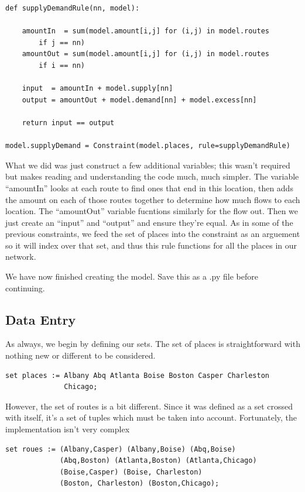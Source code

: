 \documentclass{article}
\begin{document}
\begin{verbatim}
def supplyDemandRule(nn, model):
    
    amountIn  = sum(model.amount[i,j] for (i,j) in model.routes 
        if j == nn)
    amountOut = sum(model.amount[i,j] for (i,j) in model.routes 
        if i == nn)
    
    input  = amountIn + model.supply[nn]
    output = amountOut + model.demand[nn] + model.excess[nn]
    
    return input == output

model.supplyDemand = Constraint(model.places, rule=supplyDemandRule)
\end{verbatim}

What we did was just construct a few additional variables; this wasn't required but makes reading and understanding the code much, much simpler.  The variable ``amountIn'' looks at each route to find ones that end in this location, then adds the amount on each of those routes together to determine how much flows to each location.  The ``amountOut'' variable fucntions similarly for the flow out.  Then we just create an ``input'' and ``output'' and ensure they're equal.  As in some of the previous constraints, we feed the set of places into the constraint as an arguement so it will index over that set, and thus this rule functions for all the places in our network.

We have now finished creating the model.  Save this as a .py file before continuing.

\subsection*{Data Entry}

As always, we begin by defining our sets.  The set of places is straightforward with nothing new or different to be considered.

\begin{verbatim}
set places := Albany Abq Atlanta Boise Boston Casper Charleston 
              Chicago;
\end{verbatim}

However, the set of routes is a bit different.  Since it was defined as a set crossed with itself, it's a set of tuples which must be taken into account.  Fortunately, the implementation isn't very complex

\begin{verbatim}
set roues := (Albany,Casper) (Albany,Boise) (Abq,Boise) 
             (Abq,Boston) (Atlanta,Boston) (Atlanta,Chicago) 
             (Boise,Casper) (Boise, Charleston) 
             (Boston, Charleston) (Boston,Chicago);
\end{verbatim}
\end{document}
